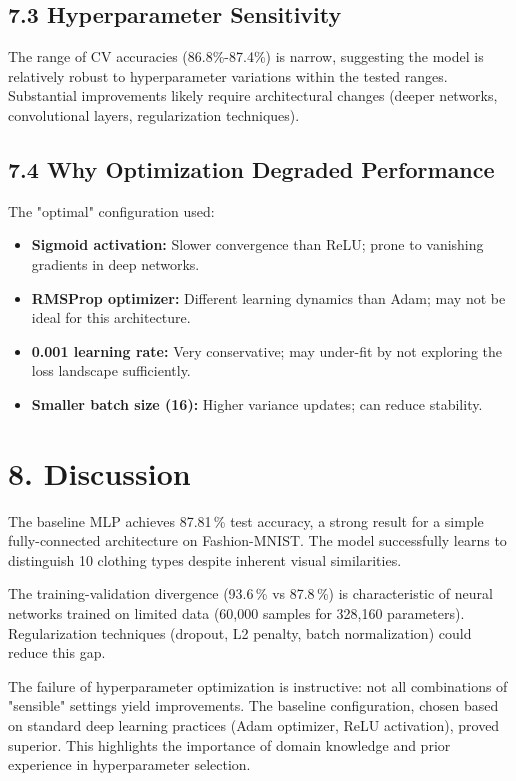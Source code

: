 \documentclass[11pt]{article}
\begin{document}
\subsection*{7.3 Hyperparameter Sensitivity}
The range of CV accuracies (86.8\%-87.4\%) is narrow, suggesting the model is relatively robust to hyperparameter variations within the tested ranges. Substantial improvements likely require architectural changes (deeper networks, convolutional layers, regularization techniques).

\subsection*{7.4 Why Optimization Degraded Performance}
The "optimal" configuration used:
\begin{itemize}
\item \textbf{Sigmoid activation:} Slower convergence than ReLU; prone to vanishing gradients in deep networks.
\item \textbf{RMSProp optimizer:} Different learning dynamics than Adam; may not be ideal for this architecture.
\item \textbf{0.001 learning rate:} Very conservative; may under-fit by not exploring the loss landscape sufficiently.
\item \textbf{Smaller batch size (16):} Higher variance updates; can reduce stability.
\end{itemize}

\section*{8. Discussion}

The baseline MLP achieves 87.81\,\% test accuracy, a strong result for a simple fully-connected architecture on Fashion-MNIST. The model successfully learns to distinguish 10 clothing types despite inherent visual similarities.

The training-validation divergence (93.6\,\% vs 87.8\,\%) is characteristic of neural networks trained on limited data (60,000 samples for 328,160 parameters). Regularization techniques (dropout, L2 penalty, batch normalization) could reduce this gap.

The failure of hyperparameter optimization is instructive: not all combinations of "sensible" settings yield improvements. The baseline configuration, chosen based on standard deep learning practices (Adam optimizer, ReLU activation), proved superior. This highlights the importance of domain knowledge and prior experience in hyperparameter selection.
\end{document}
